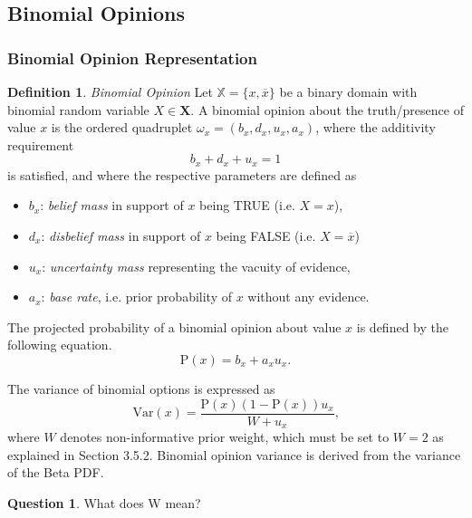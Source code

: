 \documentclass[a4paper,12pt]{article}
\theoremstyle{definition}
\newtheorem{question}{Question}[section]
\newtheorem{definition}{Definition}[section]
\numberwithin{equation}{section}
\begin{document}
\subsection{Binomial Opinions}

\subsubsection{Binomial Opinion Representation}

\begin{definition}
	\emph{Binomial Opinion} Let $\mathbb{X} = \{x, \overline{x}\}$ be a binary domain with binomial random variable $X \in \mathbf{X}$. A binomial opinion about the truth/presence of value $x$ is the ordered quadruplet $\omega_x = \left(b_x, d_x, u_x, a_x\right)$, where the additivity requirement
	\begin{equation}
		b_x + d_x + u_x = 1
	\end{equation}
	is satisfied, and where the respective parameters are defined as
	\begin{itemize}
		\item $b_x$: \emph{belief mass} in support of $x$ being TRUE (i.e. $X = x$),
		\item $d_x$: \emph{disbelief mass} in support of $x$ being FALSE (i.e. $X = \overline{x}$)
		\item $u_x$: \emph{uncertainty mass} representing the vacuity of evidence,
		\item $a_x$: \emph{base rate}, i.e. prior probability of $x$ without any evidence.
	\end{itemize}
\end{definition}

The projected probability of a binomial opinion about value $x$ is defined by the following equation.
\begin{equation}
	\mathrm{P}(x) = b_x + a_x u_x\text{.}
\end{equation}

The variance of binomial options is expressed as
\begin{equation}
	\mathrm{Var}(x) = \dfrac{\mathrm{P}(x)(1 - \mathrm{P}(x))u_x}{W + u_x}\text{,}
\end{equation}
where $W$ denotes non-informative prior weight, which must be set to $W = 2$ as explained in Section 3.5.2. Binomial opinion variance is derived from the variance of the Beta PDF.

\begin{question}
	What does W mean? 
\end{question}
\end{document}
